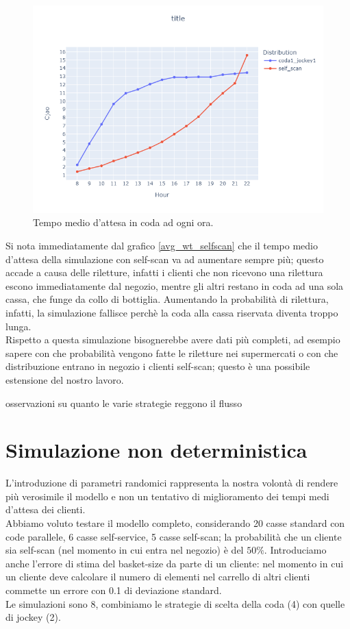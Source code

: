\begin{figure}[htp!]
	\centering
	\includegraphics[width=12cm]{"images/results/avg_wt_selfscan.png"}
	\caption{Tempo medio d'attesa in coda ad ogni ora.}
	\label{fig:avg_wt_selfscan}
\end{figure}

Si nota immediatamente dal grafico \ref{avg_wt_selfscan} che il tempo medio d'attesa della simulazione con self-scan va ad aumentare sempre più; questo accade a causa delle riletture, infatti i clienti che non ricevono una rilettura escono immediatamente dal negozio, mentre gli altri restano in coda ad una sola cassa, che funge da collo di bottiglia. Aumentando la probabilità di rilettura, infatti, la simulazione fallisce perchè la coda alla cassa riservata diventa troppo lunga. \\
Rispetto a questa simulazione bisognerebbe avere dati più completi, ad esempio sapere con che probabilità vengono fatte le riletture nei supermercati o con che distribuzione entrano in negozio i clienti self-scan; questo è una possibile estensione del nostro lavoro.


osservazioni su quanto le varie strategie reggono il flusso

\section{Simulazione non deterministica}

L'introduzione di parametri randomici rappresenta la nostra volontà di rendere più verosimile il modello e non un tentativo di miglioramento dei tempi medi d'attesa dei clienti. \\
Abbiamo voluto testare il modello completo, considerando 20 casse standard con code parallele, 6 casse self-service, 5 casse self-scan; la probabilità che un cliente sia self-scan (nel momento in cui entra nel negozio) è del $50\%$. Introduciamo anche l'errore di stima del basket-size da parte di un cliente: nel momento in cui un cliente deve calcolare il numero di elementi nel carrello di altri clienti commette un errore con 0.1 di deviazione standard. \\
Le simulazioni sono 8, combiniamo le strategie di scelta della coda (4) con quelle di jockey (2).

